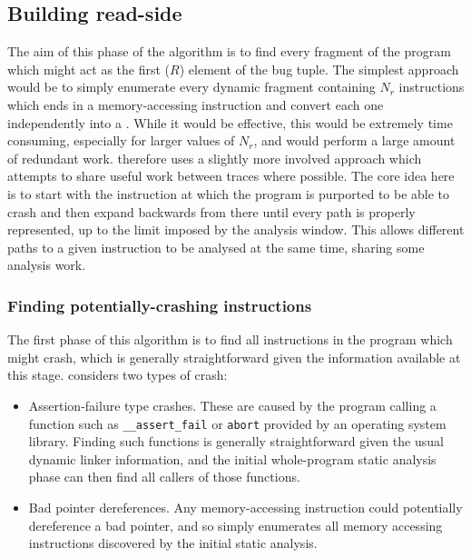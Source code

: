 \subsection{Building read-side \StateMachines}

The aim of this phase of the algorithm is to find every fragment of
the program which might act as the first ($R$)
element of the bug tuple.  The simplest approach would be to simply
enumerate every dynamic fragment containing $N_r$ instructions which
ends in a memory-accessing instruction and convert each one
independently into a \StateMachine.  While it would be effective, this
would be extremely time consuming, especially for larger values of
$N_r$, and would perform a large amount of redundant work.
\Technique{} therefore uses a slightly more involved approach which
attempts to share useful work between traces where possible.  The core
idea here is to start with the instruction at which the
program is purported to be able to crash and then expand backwards
from there until every path is properly represented, up to the limit
imposed by the analysis window.  This allows different paths to a
given instruction to be analysed at the same time, sharing some
analysis work.

\subsubsection{Finding potentially-crashing instructions}

The first phase of this algorithm is to find all instructions in the
program which might crash, which is generally straightforward given
the information available at this stage.  {\Implementation} considers
two types of crash:

\begin{itemize}
\item Assertion-failure type crashes.  These are caused by the program
  calling a function such as \verb|__assert_fail| or \verb|abort|
  provided by an operating system library.  Finding such functions is
  generally straightforward given the usual dynamic linker
  information, and the initial whole-program static analysis phase can
  then find all callers of those functions.
\item Bad pointer dereferences.  Any memory-accessing instruction
  could potentially dereference a bad pointer, and so
  {\implementation} simply enumerates all memory accessing
  instructions discovered by the initial static analysis.
\end{itemize}

